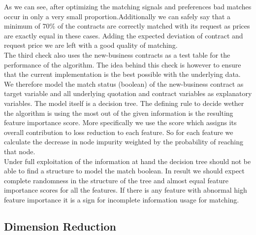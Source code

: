 \documentclass[12pt,titlepage]{article}
\begin{document}
As we can see, after optimizing the matching signals and preferences bad matches occur in only a very small proportion.Additionally we can safely say that a minimum of 70\% of the contracts are correctly matched with its request as prices are exactly equal in these cases. Adding the expected deviation of contract and request price we are left with a good quality of matching.\\
The third check also uses the new-business contracts as a test table for the performance of the algorithm. The idea behind this check is however to ensure that the current implementation is the best possible with the underlying data. \\
We therefore model the match status (boolean) of the new-business contract as target variable and all underlying quotation and contract variables as explanatory variables. The model itself is a decision tree. The defining rule to decide wether the algorithm is using the most out of the given information is the resulting feature importance score. More specifically we use the score which assigns its overall contribution to loss reduction to each feature. So for each feature we calculate the decrease in node impurity weighted by the probability of reaching that node.\\
Under full exploitation of the information at hand the decision tree should not be able to find a structure to model the match boolean. In result we should expect complete randomness in the structure of the tree and almost equal feature importance scores for all the features. If there is any feature with abnormal high feature importance it is a sign for incomplete information usage for matching. \\


\subsection{Dimension Reduction} \par
\end{document}
